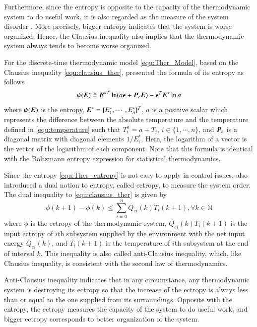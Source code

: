 \documentclass[preprint,authoryear,12pt]{elsarticle}
\renewcommand{\vec}[1]{\mbox{\boldmath$#1$}}
\newcommand{\mat}[1]{\mbox{\boldmath$#1$}}
\begin{document}
Furthermore, since the entropy is opposite to the capacity of the
thermodynamic system to do useful work, it is also regarded as the
measure of the system disorder \citep{balmakov_entropy_2001}. More
precisely, bigger entropy indicates that the system is worse
organized. Hence, the Clausius inequality also implies that the
thermodynamic system always tends to become worse organized.

For the discrete-time thermodynamic model \eqref{equ:Ther_Model},
based on the Clausius inequality \eqref{equ:clausius_ther},
\citet{haddad_thermodynamic_2005} presented the formula of its
entropy as follows
\begin{equation}
\psi(\vec{E}) \triangleq{\vec{E}^*}^T \ln
(a\vec{\epsilon}+\mat{P}_e\vec{E}) -\vec{\epsilon}^T\vec{E}^*\ln a
\label{equ:Ther_entropy}
\end{equation}
where $\psi(\vec{E})$ is the entropy,
$\vec{E}^*=[E^*_1,\cdots,E^*_n]^T$, $a$ is a positive scalar which
represents the difference between the absolute temperature and the
temperature defined in \eqref{equ:temperature} such that
$T^a_i=a+T_i$, $i\in\{1,\cdots,n\}$, and $\mat{P}_e$ is a diagonal
matrix with diagonal elements $1/E^*_i$. Here, the logarithm of a
vector is the vector of the logarithm of each component.
Note that this formula is identical with the Boltzmann entropy
expression for statistical thermodynamics. 

Since the entropy \eqref{equ:Ther_entropy} is not easy
to apply in control issues, \citet{haddad_thermodynamic_2005} also
introduced a dual notion to entropy, called ectropy, to measure the
system order. The dual inequality to \eqref{equ:clausius_ther} is
given by
\begin{equation}\label{equ:anti_clausius}
\phi(k+1)-\phi(k)\le \sum_{i=0}^n Q_{ei}(k)T_i(k+1),
\forall k\in\mathbb{N}
\end{equation}
where $\phi$ is the ectropy of the thermodynamic system,
$Q_{ei}(k)T_i(k+1)$ is the input ectropy of $i$th subsystem supplied
by the environment with the net input energy $Q_{ei}(k)$, and
$T_i(k+1)$ is the temperature of $i$th subsystem at the end of
interval $k$. This inequality is also called anti-Clausius
inequality, which, like Clausius inequality, is consistent with the
second law of thermodynamics.

Anti-Clausius inequality indicates that in any circumstance, any
thermodynamic system is destroying its ectropy so that the increase
of the ectropy is always less than or equal to the one supplied from
its surroundings. Opposite with the entropy, the ectropy measures the
capacity of the system to do useful work, and bigger ectropy
corresponds to better organization of the system.
\end{document}
